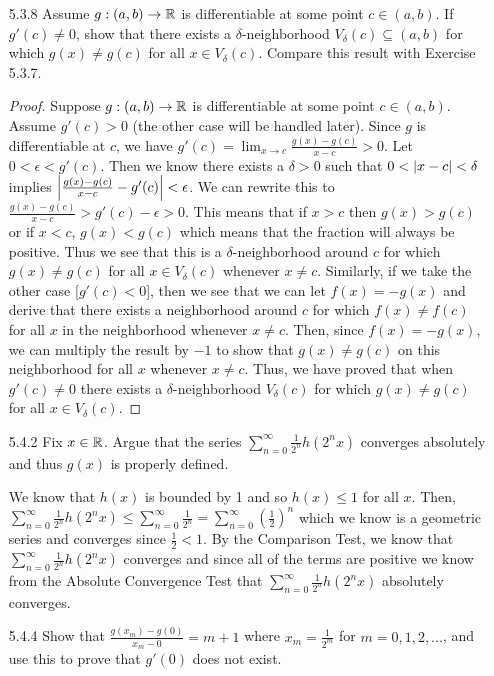 \documentclass[12pt,letterpaper]{article}
\begin{document}
\begin{itemize}[leftmargin=!,labelindent=5pt]
        \item [5.3.8] Assume $g:(a,b) \to \mathbb{R}$ is differentiable at some point $c \in (a,b)$. If $g'(c) \neq 0$, show that there exists a $\delta$-neighborhood $V_\delta(c) \subseteq (a,b)$ for which $g(x) \neq g(c)$ for all $x \in V_\delta(c)$. Compare this result with Exercise 5.3.7.
            \begin{proof}
                Suppose $g:(a,b) \to \mathbb{R}$ is differentiable at some point $c \in (a,b)$.
                Assume $g'(c) > 0$ (the other case will be handled later).
                Since $g$ is differentiable at $c$, we have $g'(c) = \lim_{x \to c} \frac{g(x) - g(c)}{x - c} > 0$.
                Let $0 < \epsilon < g'(c)$.
                Then we know there exists a $\delta > 0$ such that $0 < \abs{x-c} < \delta$ implies $\abs{\frac{g(x) - g(c)}{x-c} - g'(c)} < \epsilon$.
                We can rewrite this to $\frac{g(x) - g(c)}{x-c} > g'(c) - \epsilon > 0$.
                This means that if $x > c$ then $g(x) > g(c)$ or if $x < c$, $g(x) < g(c)$ which means that the fraction will always be positive.
                Thus we see that this is a $\delta$-neighborhood around $c$ for which $g(x) \neq g(c)$ for all $x \in V_\delta(c)$ whenever $x\neq c$.
                Similarly, if we take the other case [$g'(c) < 0$], then we see that we can let $f(x) = -g(x)$ and derive that there exists a neighborhood around $c$ for which $f(x) \neq f(c)$ for all $x$ in the neighborhood whenever $x \neq c$.
                Then, since $f(x) = -g(x)$, we can multiply the result by $-1$ to show that $g(x) \neq g(c)$ on this neighborhood for all $x$ whenever $x \neq c$.
                Thus, we have proved that when $g'(c) \neq 0$ there exists a $\delta$-neighborhood $V_\delta(c)$ for which $g(x) \neq g(c)$ for all $x \in V_\delta(c)$.
            \end{proof}
        \item [5.4.2] Fix $x \in \mathbb{R}$. Argue that the series $\sum_{n=0}^{\infty} \frac{1}{2^n}h(2^n x)$ converges absolutely and thus $g(x)$ is properly defined.
        
            We know that $h(x)$ is bounded by 1 and so $h(x) \leq 1$ for all $x$.
            Then, $\sum_{n=0}^{\infty} \frac{1}{2^n}h(2^n x) \leq \sum_{n=0}^{\infty} \frac{1}{2^n} = \sum_{n=0}^{\infty} (\frac{1}{2})^n$ which we know is a geometric series and converges since $\frac{1}{2} < 1$.
            By the Comparison Test, we know that $\sum_{n=0}^{\infty} \frac{1}{2^n}h(2^n x)$ converges and since all of the terms are positive we know from the Absolute Convergence Test that $\sum_{n=0}^{\infty} \frac{1}{2^n}h(2^n x)$ absolutely converges.
        \newpage
        \item [5.4.4] Show that $\frac{g(x_m) - g(0)}{x_m - 0} = m+1$ where $x_m = \frac{1}{2^m}$ for $m = 0,1,2,...$, and use this to prove that $g'(0)$ does not exist.
            

\end{itemize}
\end{document}
